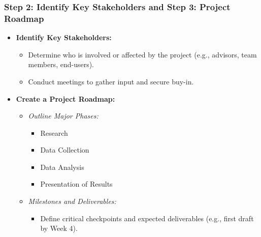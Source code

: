 \documentclass[aspectratio=169]{beamer}
\begin{document}
\begin{frame}[fragile]
    \frametitle{Step 2: Identify Key Stakeholders and Step 3: Project Roadmap}
    \begin{itemize}
        \item \textbf{Identify Key Stakeholders:}
        \begin{itemize}
            \item Determine who is involved or affected by the project (e.g., advisors, team members, end-users).
            \item Conduct meetings to gather input and secure buy-in.
        \end{itemize}
        
        \item \textbf{Create a Project Roadmap:}
        \begin{itemize}
            \item \textit{Outline Major Phases:}
            \begin{itemize}
                \item Research
                \item Data Collection
                \item Data Analysis
                \item Presentation of Results
            \end{itemize}
            \item \textit{Milestones and Deliverables:}
            \begin{itemize}
                \item Define critical checkpoints and expected deliverables (e.g., first draft by Week 4).
            \end{itemize}
        \end{itemize}
    \end{itemize}
\end{frame}
\end{document}
